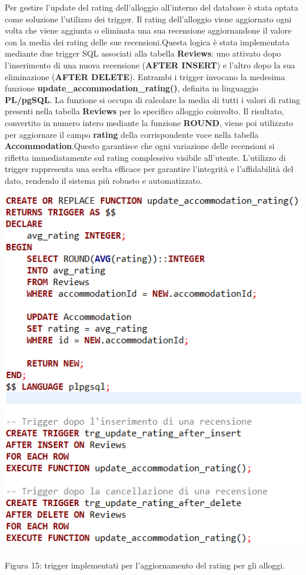 \documentclass[10pt]{article}
\begin{document}
Per gestire l'update del rating dell'alloggio all'interno del database è stata optata come soluzione l'utilizzo dei trigger. Il rating dell'alloggio viene aggiornato ogni volta che viene aggiunta o eliminata una sua recensione aggiornandone il valore con la media dei rating delle sue recensioni.\newline Questa logica è stata implementata mediante due trigger SQL associati alla tabella \textbf{Reviews}: uno attivato dopo l'inserimento di una nuova recensione (\textbf{AFTER INSERT}) e l'altro dopo la sua eliminazione (\textbf{AFTER DELETE}). Entrambi i trigger invocano la medesima funzione \textbf{update\_accommodation\_rating()}, definita in linguaggio \textbf{PL/pgSQL}. La funzione si occupa di calcolare la media di tutti i valori di rating presenti nella tabella \textbf{Reviews} per lo specifico alloggio coinvolto. Il risultato, convertito in numero intero mediante la funzione \textbf{ROUND}, viene poi utilizzato per aggiornare il campo \textbf{rating} della corrispondente voce nella tabella \textbf{Accommodation}.\newline Questo garantisce che ogni variazione delle recensioni si rifletta immediatamente sul rating complessivo visibile all'utente.
L'utilizzo di trigger rappresenta una scelta efficace per garantire l’integrit\`a e l'affidabilit\`a del dato, rendendo il sistema più robusto e automatizzato.

\begin{center}
\par\medskip
\includegraphics[scale=0.65]{trigger/trigger}
\par\medskip
Figura 15: trigger implementati per l'aggiornamento del rating per gli alloggi.
\par\medskip
\end{center}
\end{document}
